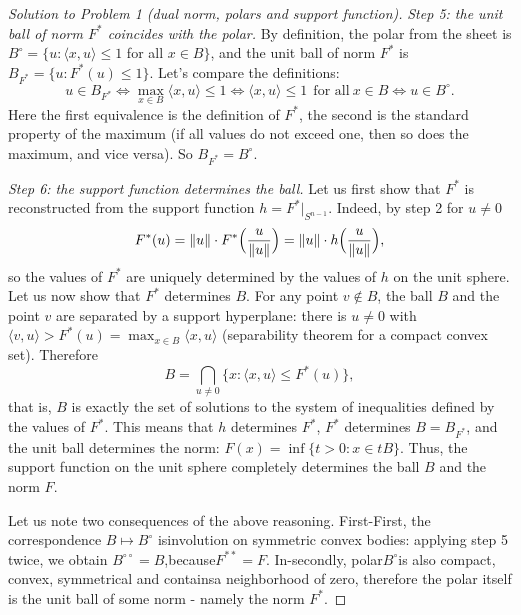 \documentclass[a4paper,12pt]{report}
\begin{document}
\begin{proof}[Solution to Problem \textup{1} \textup{(}dual norm, polars and support function\textup{)}]
\textit{Step \textup{5}\textup{:} the unit ball of norm $F^*$ coincides with the polar.} By definition, the polar from the sheet is $B^\circ=\{u: \langle x,u\rangle\le1$ for all $x\in B\}$, and the unit ball of norm $F^*$ is $B_{F^*}=\{u: F^*(u)\le1\}$. Let's compare the definitions:
\[
u\in B_{F^*}\iff \max_{x\in B}\langle x,u\rangle\le1\iff \langle x,u\rangle\le1\ \ \text{for all}\ x\in B\iff u\in B^\circ .
\]
Here the first equivalence is the definition of $F^*$, the second is the standard property of the maximum \textup{(}if all values do not exceed one, then so does the maximum, and vice versa\textup{)}. So $B_{F^*}=B^\circ$.

\textit{Step \textup{6}\textup{:} the support function determines the ball.} Let us first show that $F^*$ is reconstructed from the support function $h=F^*|_{S^{n-1}}$. Indeed, by step \textup{2} for $u\ne0$
\[
F^*(u)=\|u\|\cdot F^*\Bigl(\frac{u}{\|u\|}\Bigr)=\|u\|\cdot h\Bigl(\frac{u}{\|u\|}\Bigr),
\]
so the values of $F^*$ are uniquely determined by the values of $h$ on the unit sphere. Let us now show that $F^*$ determines $B$. For any point $v\notin B$, the ball $B$ and the point $v$ are separated by a support hyperplane\textup{:} there is $u\ne0$ with $\langle v,u\rangle>F^*(u)=\max_{x\in B}\langle x,u\rangle$ \textup{(}separability theorem for a compact convex set\textup{)}. Therefore
\[
B=\bigcap_{u\ne0}\{x: \langle x,u\rangle\le F^*(u)\},
\]
that is, $B$ is exactly the set of solutions to the system of inequalities defined by the values of $F^*$. This means that $h$ determines $F^*$, $F^*$ determines $B=B_{F^*}$, and the unit ball determines the norm\textup{:} $F(x)=\inf\{t>0: x\in tB\}$. Thus, the support function on the unit sphere completely determines the ball $B$ and the norm $F$.

Let us note two consequences of the above reasoning. First\textup{-}First, the correspondence $B\mapsto B^\circ$ isinvolution on symmetric convex bodies: applying step \textup{5} twice, we obtain $B^{\circ\circ}=B$,because$F^{**}=F$. In\textup{-}secondly, polar$B^\circ$is also compact, convex, symmetrical and containsa neighborhood of zero, therefore the polar itself is the unit ball of some norm - namely the norm $F^*$.

\end{proof}
\end{document}
